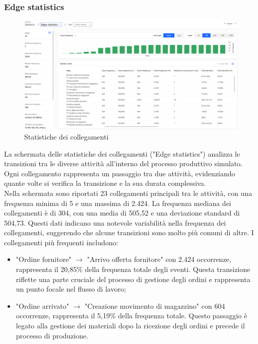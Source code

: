 \documentclass{article}
\begin{document}
\subsubsection{Edge statistics}
\begin{figure}[H]
    \centering
    \includegraphics[width=\textwidth]{imgMicrosoft/TerzaSimulazione/StatisticsEdgeStatisticsSimulazione3.png}
    \caption{Statistiche dei collegamenti}
    \label{fig:edge-statistics}
\end{figure}
La schermata delle statistiche dei collegamenti ("Edge statistics") analizza le transizioni tra le diverse attività all'interno del processo produttivo simulato. Ogni collegamento rappresenta un passaggio tra due attività, evidenziando quante volte si verifica la transizione e la sua durata complessiva.\\
Nella schermata sono riportati 23 collegamenti principali tra le attività, con una frequenza minima di 5 e una massima di 2.424. La frequenza mediana dei collegamenti è di 304, con una media di 505,52 e una deviazione standard di 504,73. Questi dati indicano una notevole variabilità nella frequenza dei collegamenti, suggerendo che alcune transizioni sono molto più comuni di altre. I collegamenti più frequenti includono:
\begin{itemize}
    \item "Ordine fornitore" $\rightarrow$ "Arrivo offerta fornitore" con 2.424 occorrenze, rappresenta il 20,85\% della frequenza totale degli eventi. Questa transizione riflette una parte cruciale del processo di gestione degli ordini e rappresenta un punto focale nel flusso di lavoro;
    \item "Ordine arrivato" $\rightarrow$ "Creazione movimento di magazzino" con 604 occorrenze, rappresenta il 5,19\% della frequenza totale. Questo passaggio è legato alla gestione dei materiali dopo la ricezione degli ordini e precede il processo di produzione.
\end{itemize}
\end{document}
